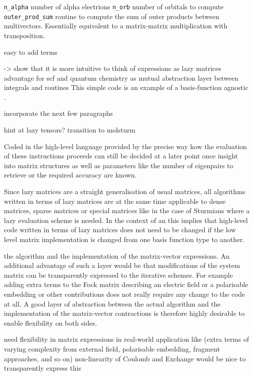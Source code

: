 \texttt{n\_alpha} number of alpha electrions
\texttt{n\_orb} number of orbitals to compute
\texttt{outer\_prod\_sum} routine to compute the sum of outer products
between multivectors.
Essentially equivalent to a matrix-matrix multiplication with transposition.


easy to add terms

-> show that it is more intuitive to think of \contraction expressions as lazy matrices
advantage for scf and quantum chemistry
\lazyten as mutual abstraction layer between integrals and \SCF routines
This simple code is an example of a basis-function agnostic \SCF.

incorporate the next few paragraphs

hint at lazy tensors?
transition to molsturm











Coded in the high-level language provided by \lazyten
the precise way how the evaluation of these instructions proceeds
can still be decided at a later point
once insight into matrix structures as well as
parameters like the number of eigenpairs to retrieve or the required accuracy are known.


Since lazy matrices are a straight generalisation of usual matrices,
all algorithms written in terms of lazy matrices
are at the same time applicable to dense matrices,
sparse matrices or special matrices like in the case of Sturmians
where a lazy evaluation scheme is needed.
In the context of an \SCF this implies that high-level code
written in terms of lazy matrices
does not need to be changed if the low level matrix implementation
is changed from one basis function type to another.


the \SCF algorithm
and the implementation of the matrix-vector \contraction expressions.
An additional advantage of such a layer would be that
modifications of the system matrix can be transparently expressed
to the iterative schemes.
For example adding extra terms to the Fock matrix
describing an electric field or a polarisable embedding
or other contributions does not really require
any change to the \SCF code at all.
A good layer of abstraction between the actual \SCF algorithm
and the implementation of the matrix-vector contractions
is therefore highly desirable to enable flexibility on both sides.

need flexibility in matrix expressions in real-world application
like \SCF (extra terms of varying complexity from external field,
polarisable embedding, fragment approaches, and so on)
non-linearity of Coulomb and Exchange
would be nice to transparently express this

